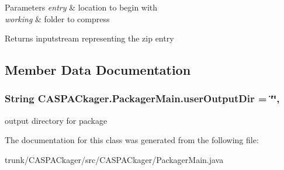 \begin{DoxyParams}{Parameters}
{\em entry} & location to begin with \\
\hline
{\em working} & folder to compress \\
\hline
\end{DoxyParams}
\begin{DoxyReturn}{Returns}
inputstream representing the zip entry 
\end{DoxyReturn}


\subsection{Member Data Documentation}
\hypertarget{classCASPACkager_1_1PackagerMain_a0095242e26294a46bcb44dde15d36c38}{
\subsubsection[{user\-Output\-Dir}]{\setlength{\rightskip}{0pt plus 5cm}String C\-A\-S\-P\-A\-Ckager.\-Packager\-Main.\-user\-Output\-Dir = \char`\"{}\char`\"{}\hspace{0.3cm}{\ttfamily [static]}, {\ttfamily [protected]}}}\label{classCASPACkager_1_1PackagerMain_a0095242e26294a46bcb44dde15d36c38}
output directory for package 

The documentation for this class was generated from the following file\-:\begin{DoxyCompactItemize}
\item 
trunk/\-C\-A\-S\-P\-A\-Ckager/src/\-C\-A\-S\-P\-A\-Ckager/Packager\-Main.\-java\end{DoxyCompactItemize}
